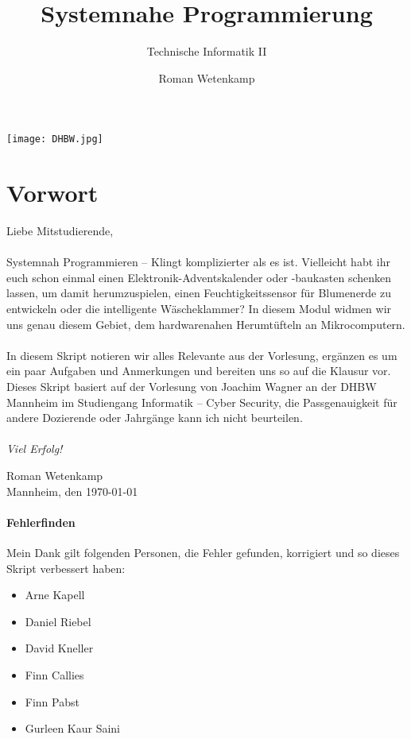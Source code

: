 \documentclass[11pt,a4paper]{scrartcl}
\author{Roman Wetenkamp}
\title{Systemnahe Programmierung}
\subtitle{Technische Informatik II}
\begin{document}
\vspace{3cm}
\maketitle
\begin{center}
\texttt{[image: DHBW.jpg]}
\end{center}
\pagebreak
\tableofcontents
\pagebreak
\section*{Vorwort}
Liebe Mitstudierende, \\\\
Systemnah Programmieren -- Klingt komplizierter als es ist. Vielleicht habt ihr euch schon einmal einen Elektronik-Adventskalender oder -baukasten schenken lassen, um damit herumzuspielen, einen Feuchtigkeitssensor für Blumenerde zu entwickeln oder die intelligente Wäscheklammer? In diesem Modul widmen wir uns genau diesem Gebiet, dem hardwarenahen Herumtüfteln an Mikrocomputern. \\\\
In diesem Skript notieren wir alles Relevante aus der Vorlesung, ergänzen es um ein paar Aufgaben und Anmerkungen und bereiten uns so auf die Klausur vor. Dieses Skript basiert auf der Vorlesung von Joachim Wagner an der DHBW Mannheim im Studiengang Informatik -- Cyber Security, die Passgenauigkeit für andere Dozierende oder Jahrgänge kann ich nicht beurteilen. \\\\
\textit{Viel Erfolg!}  \\
\begin{flushright}
Roman Wetenkamp \\
Mannheim, den \today
\end{flushright}  
\vfill
\paragraph{Fehlerfinden}
Mein Dank gilt folgenden Personen, die Fehler gefunden, korrigiert und so dieses Skript verbessert haben: 
\begin{itemize}
\item Arne Kapell
\item Daniel Riebel
\item David Kneller
\item Finn Callies
\item Finn Pabst
\item Gurleen Kaur Saini
\end{itemize}
\end{document}
